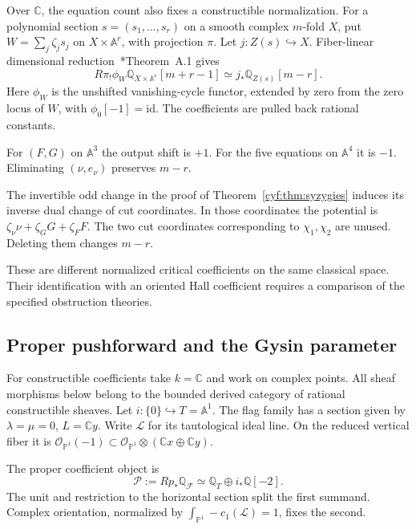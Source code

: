 Over \(\mathbb C\), the equation count also fixes a
constructible normalization. For a polynomial section
\(s=(s_1,\ldots,s_r)\) on a smooth complex \(m\)-fold
\(X\), put \(W=\sum_j\zeta_js_j\) on
\(X\times\mathbb A^r\), with projection \(\pi\).
Let \(j:Z(s)\hookrightarrow X\). Fiber-linear dimensional
reduction~\cite{DavisonCriticalCoHA}*{Theorem~A.1} gives
\begin{equation}\label{cyf:eq:critical-shift}
 R\pi_!\phi_W\mathbb Q_{X\times\mathbb A^r}[m+r-1]
                 \simeq j_*\mathbb Q_{Z(s)}[m-r].
\end{equation}
Here \(\phi_W\) is the unshifted vanishing-cycle functor,
extended by zero from the zero locus of \(W\), with
\(\phi_0[-1]=\mathrm{id}\). The coefficients are pulled
back rational constants.

For \((F,G)\) on \(\mathbb A^3\) the output shift is
\(+1\). For the five equations on \(\mathbb A^4\) it is
\(-1\). Eliminating \((\nu,e_\nu)\) preserves \(m-r\).

The invertible odd change in the proof of
Theorem~\ref{cyf:thm:syzygies} induces its inverse dual
change of cut coordinates. In those coordinates the
potential is \(\zeta_\nu\nu+\zeta_GG+\zeta_FF\).
The two cut coordinates corresponding to \(\chi_1,\chi_2\)
are unused. Deleting them changes \(m-r\).

These are
different normalized critical coefficients on the same
classical space. Their identification with an oriented
Hall coefficient requires a comparison of the specified
obstruction theories.

\subsection{Proper pushforward and the Gysin parameter}

For constructible coefficients take \(k=\mathbb C\) and work
on complex points. All sheaf morphisms below belong to the
bounded derived category of rational constructible sheaves.
Let \(i:\{0\}\hookrightarrow T=\mathbb A^1\).
The flag family has a section given by
\(\lambda=\mu=0\), \(L=\mathbb C y\).
Write \(\mathscr L\) for its tautological ideal line.
On the reduced vertical fiber it is
\(\mathcal O_{\mathbb P^1}(-1)\subset
\mathcal O_{\mathbb P^1}\otimes(\mathbb C x\oplus\mathbb C y)\).

\begin{theorem}\label{cyf:thm:proper}
The proper coefficient object is
\begin{equation}\label{cyf:eq:proper}
 \mathscr P:=Rp_*\mathbb Q_{\mathscr F}
                  \simeq\mathbb Q_T\oplus i_*\mathbb Q[-2].
\end{equation}
The unit and restriction to the horizontal section split
the first summand. Complex orientation, normalized by
\(\int_{\mathbb P^1}-c_1(\mathscr L)=1\), fixes the second.
\end{theorem}

